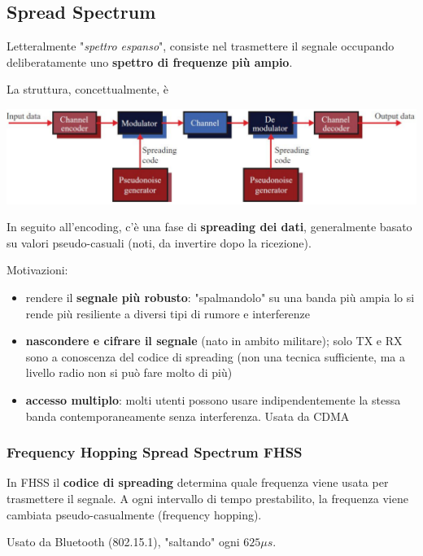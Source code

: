 \subsection{Spread Spectrum}

Letteralmente "\textit{spettro espanso}", consiste nel trasmettere il segnale occupando deliberatamente uno \textbf{spettro di frequenze più ampio}.

La struttura, concettualmente, è
\begin{center}
	\includegraphics[width=0.98\linewidth]{img/wireless/ss1}
\end{center}

In seguito all'encoding, c'è una fase di \textbf{spreading dei dati}, generalmente basato su valori pseudo-casuali (noti, da invertire dopo la ricezione).

Motivazioni:
\begin{itemize}
	\item rendere il \textbf{segnale più robusto}: "spalmandolo" su una banda più ampia lo si rende più resiliente a diversi tipi di rumore e interferenze
	
    \item \textbf{nascondere e cifrare il segnale} (nato in ambito militare); solo TX e RX sono a conoscenza del codice di spreading (non una tecnica sufficiente, ma a livello radio non si può fare molto di più)
    
	\item \textbf{accesso multiplo}: molti utenti possono usare indipendentemente la stessa banda contemporaneamente senza interferenza. Usata da CDMA
\end{itemize}

\subsubsection{Frequency Hopping Spread Spectrum FHSS}

In FHSS il \textbf{codice di spreading} determina quale frequenza viene usata per trasmettere il segnale. A ogni intervallo di tempo prestabilito, la frequenza viene cambiata pseudo-casualmente (frequency hopping). 

Usato da Bluetooth (802.15.1), "saltando" ogni $625 \mu s$.

